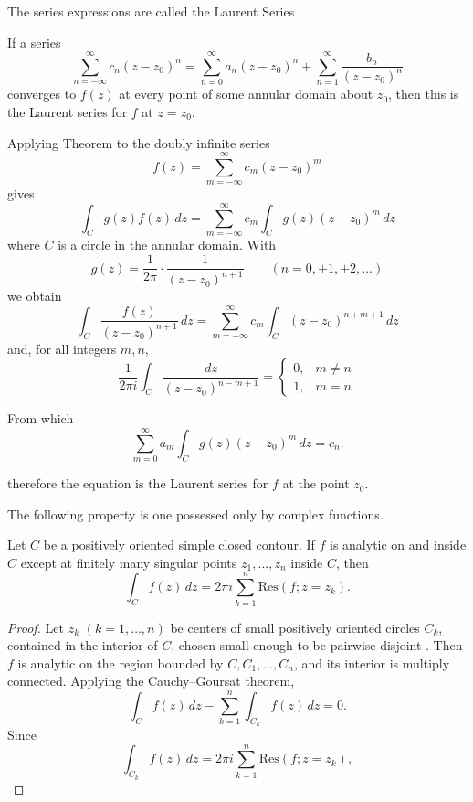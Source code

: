 \documentclass{article}
\begin{document}
The series expressions are called the Laurent Series

\begin{theorem}
If a series
\[
\sum_{n=-\infty}^{\infty} c_n(z-z_0)^n
=\sum_{n=0}^{\infty} a_n(z-z_0)^n+\sum_{n=1}^{\infty}\frac{b_n}{(z-z_0)^n}

\]
converges to $f(z)$ at every point of some annular domain about $z_0$, then this is the Laurent series for $f$ at $z=z_0$.
\end{theorem}

Applying Theorem to the doubly infinite series
\[
f(z)=\sum_{m=-\infty}^{\infty} c_m(z-z_0)^m
\]
gives
\[
\int_C g(z)f(z)\,dz=\sum_{m=-\infty}^{\infty} c_m \int_C g(z)(z-z_0)^m\,dz 
\]
where $C$ is a circle in the annular domain. With
\[
g(z)=\frac{1}{2\pi}\cdot\frac{1}{(z-z_0)^{n+1}} \qquad (n=0,\pm1,\pm2,\dots)
\]
we obtain
\[
\int_C \frac{f(z)}{(z-z_0)^{n+1}}\,dz=\sum_{m=-\infty}^{\infty} c_m \int_C (z-z_0)^{n+m+1}\,dz 
\]
and, for all integers $m,n$,
\[
\frac{1}{2\pi i}\int_C \frac{dz}{(z-z_0)^{n-m+1}}=
\begin{cases}
0, & m\neq n\\
1, & m=n
\end{cases}
\]

From which
\[
\sum_{m=0}^{\infty} a_m\int_C g(z)(z-z_0)^m\,dz=c_n.
\]

therefore the equation is the Laurent series for $f$ at the point $z_0$.

The following property is one possessed only by complex functions.

\begin{theorem}
Let $C$ be a positively oriented simple closed contour. If $f$ is analytic on and inside $C$ except at finitely many singular points $z_1,\dots,z_n$ inside $C$, then
\[
\int_C f(z)\,dz = 2\pi i \sum_{k=1}^n \mathrm{Res}(f; z=z_k). 
\]
\end{theorem}

\begin{proof}
Let $z_k$ $(k=1,\dots,n)$ be centers of small positively oriented circles $C_k$, contained in the interior of $C$, chosen small enough to be pairwise disjoint . Then $f$ is analytic on the region bounded by $C, C_1,\dots,C_n$, and its interior is multiply connected. Applying the Cauchy--Goursat theorem,
\[
\int_C f(z)\,dz - \sum_{k=1}^n \int_{C_k} f(z)\,dz = 0.
\]
Since
\[
\int_{C_k} f(z)\,dz = 2\pi i \sum_{k=1}^n \mathrm{Res}(f; z=z_k),
\]

\end{proof}
\end{document}
